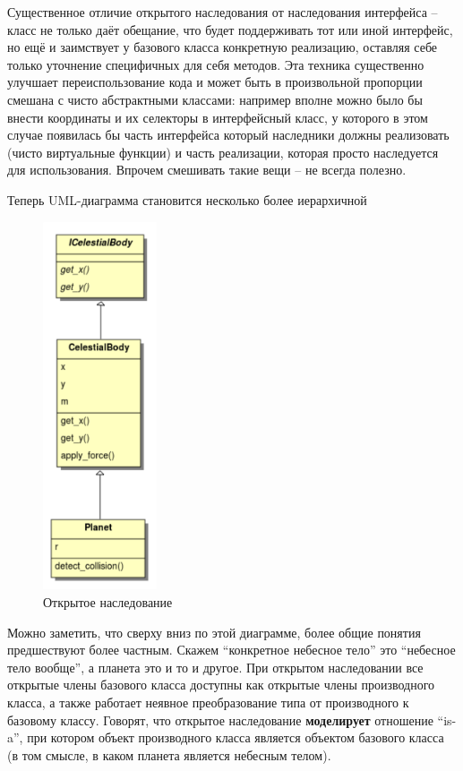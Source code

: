 \documentclass[a4paper,12pt,oneside]{article}
\begin{document}
Существенное отличие открытого наследования от наследования интерфейса -- класс не только даёт обещание, что будет поддерживать тот или иной интерфейс, но ещё и заимствует у базового класса конкретную реализацию, оставляя себе только уточнение специфичных для себя методов. Эта техника существенно улучшает переиспользование кода и может быть в произвольной пропорции смешана с чисто абстрактными классами: например вполне можно было бы внести координаты и их селекторы в интерфейсный класс, у которого в этом случае появилась бы часть интерфейса который наследники должны реализовать (чисто виртуальные функции) и часть реализации, которая просто наследуется для использования. Впрочем смешивать такие вещи -- не всегда полезно.

Теперь UML-диаграмма становится несколько более иерархичной

\begin{figure}[h!]
\centering
\includegraphics[width=0.3\textwidth]{illustrations/indiag2.pdf}
\caption{Открытое наследование}
\label{fig:inheritance-implementation}
\end{figure}

Можно заметить, что сверху вниз по этой диаграмме, более общие понятия предшествуют более частным. Скажем ``конкретное небесное тело'' это ``небесное тело вообще'', а планета это и то и другое. При открытом наследовании все открытые члены базового класса доступны как открытые члены производного класса, а также работает неявное преобразование типа от производного к базовому классу. Говорят, что открытое наследование \textbf{моделирует} отношение ``is-a'', при котором объект производного класса является объектом базового класса (в том смысле, в каком планета является небесным телом).
\end{document}

